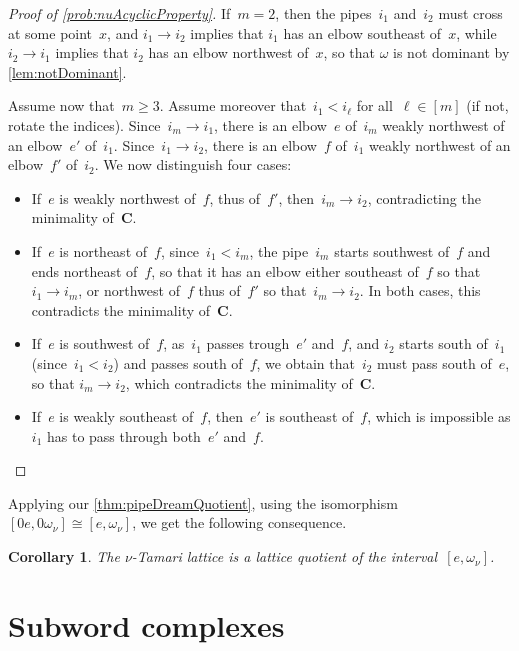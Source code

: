\documentclass[reqno]{amsart}
\newtheorem{corollary}[theorem]{Corollary}
\theoremstyle{definition}
\renewcommand{\b}[1]{\boldsymbol{#1}} %
\begin{document}
\begin{proof}[Proof of \cref{prob:nuAcyclicProperty}]
If~$m = 2$, then the pipes~$i_1$ and~$i_2$ must cross at some point~$x$, and $i_1 \to i_2$ implies that $i_1$ has an elbow southeast of~$x$, while $i_2 \to i_1$ implies that $i_2$ has an elbow northwest of~$x$, so that $\omega$ is not dominant by \cref{lem:notDominant}.

Assume now that~$m \ge 3$.
Assume moreover that~$i_1 < i_\ell$ for all~$\ell \in [m]$ (if not, rotate the indices).
Since~$i_m \to i_1$, there is an elbow~$e$ of~$i_m$ weakly northwest of an elbow~$e'$ of~$i_1$.
Since~$i_1 \to i_2$, there is an elbow~$f$ of~$i_1$ weakly northwest of an elbow~$f'$ of~$i_2$.
We now distinguish four cases:
\begin{itemize}
\item If~$e$ is weakly northwest of~$f$, thus of~$f'$, then~$i_m \to i_2$, contradicting the minimality of~$\b{C}$.
\item If~$e$ is northeast of~$f$, since~$i_1 < i_m$, the pipe~$i_m$ starts southwest of~$f$ and ends northeast of~$f$, so that it has an elbow either southeast of~$f$ so that~$i_1 \to i_m$, or northwest of~$f$ thus of~$f'$ so that~$i_m \to i_2$. In both cases, this contradicts the minimality of~$\b{C}$.
\item If~$e$ is southwest of~$f$, as~$i_1$ passes trough~$e'$ and~$f$, and $i_2$ starts south of~$i_1$ (since~$i_1 < i_2$) and passes south of~$f$, we obtain that~$i_2$ must pass south of~$e$, so that $i_m \to i_2$, which contradicts the minimality of~$\b{C}$.
\item If~$e$ is weakly southeast of~$f$, then~$e'$ is southeast of~$f$, which is impossible as $i_1$ has to pass through both~$e'$ and~$f$.
\qedhere
\end{itemize}
\end{proof}

Applying our \cref{thm:pipeDreamQuotient}, using the isomorphism $[0e,0\omega_\nu]\cong [e,\omega_\nu]$, we get the following consequence.

\begin{corollary}
The $\nu$-Tamari lattice is a lattice quotient of the interval~$[e,\omega_\nu]$.
\end{corollary}  


\section{Subword complexes}
\label{sec:subwordComplexes}
\end{document}
